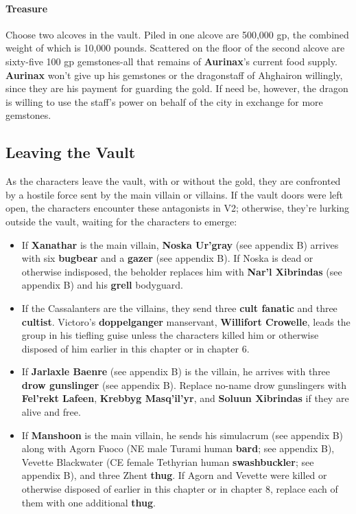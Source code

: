 \documentclass[10pt,a4paper,twoside,twocolumn,openany,nodeprecatedcode]{dndbook}
\begin{document}
\paragraph{Treasure}
Choose two alcoves in the vault. Piled in one alcove are 500,000 gp, the combined weight of which is 10,000 pounds. Scattered on the floor of the second alcove are sixty-five 100 gp gemstones-all that remains of \textbf{Aurinax}'s current food supply.
\textbf{Aurinax} won't give up his gemstones or the dragonstaff of Ahghairon willingly, since they are his payment for guarding the gold. If need be, however, the dragon is willing to use the staff's power on behalf of the city in exchange for more gemstones.
\subsection{Leaving the Vault}
As the characters leave the vault, with or without the gold, they are confronted by a hostile force sent by the main villain or villains. If the vault doors were left open, the characters encounter these antagonists in V2; otherwise, they're lurking outside the vault, waiting for the characters to emerge:
\begin{itemize}

\item If \textbf{Xanathar} is the main villain, \textbf{Noska Ur'gray} (see appendix B) arrives with six \textbf{bugbear} and a \textbf{gazer} (see appendix B). If Noska is dead or otherwise indisposed, the beholder replaces him with \textbf{Nar'l Xibrindas} (see appendix B) and his \textbf{grell} bodyguard.
\item If the Cassalanters are the villains, they send three \textbf{cult fanatic} and three \textbf{cultist}. Victoro's \textbf{doppelganger} manservant, \textbf{Willifort Crowelle}, leads the group in his tiefling guise unless the characters killed him or otherwise disposed of him earlier in this chapter or in chapter 6.
\item If \textbf{Jarlaxle Baenre} (see appendix B) is the villain, he arrives with three \textbf{drow gunslinger} (see appendix B). Replace no-name drow gunslingers with \textbf{Fel'rekt Lafeen}, \textbf{Krebbyg Masq'il'yr}, and \textbf{Soluun Xibrindas} if they are alive and free.
\item If \textbf{Manshoon} is the main villain, he sends his simulacrum (see appendix B) along with Agorn Fuoco (NE male Turami human \textbf{bard}; see appendix B), Vevette Blackwater (CE female Tethyrian human \textbf{swashbuckler}; see appendix B), and three Zhent \textbf{thug}. If Agorn and Vevette were killed or otherwise disposed of earlier in this chapter or in chapter 8, replace each of them with one additional \textbf{thug}.
\end{itemize}
\end{document}
